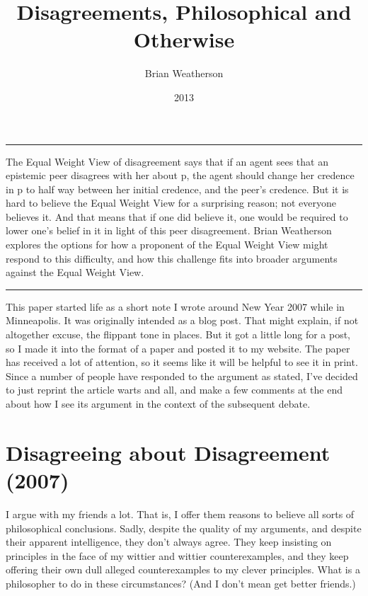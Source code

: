 \documentclass[
  10pt,
  letterpaper,
  DIV=11,
  numbers=noendperiod,
  twoside]{scrartcl}
\title{Disagreements, Philosophical and Otherwise}
\author{Brian Weatherson}
\date{2013}
\renewenvironment{abstract}
 {\vspace{-1.25cm}
 \quotation\small\noindent\rule{\linewidth}{.5pt}\par\smallskip
 \noindent }
 {\par\noindent\rule{\linewidth}{.5pt}\endquotation}
\begin{document}
\maketitle
\begin{abstract}
The Equal Weight View of disagreement says that if an agent sees that an
epistemic peer disagrees with her about p, the agent should change her
credence in p to half way between her initial credence, and the peer's
credence. But it is hard to believe the Equal Weight View for a
surprising reason; not everyone believes it. And that means that if one
did believe it, one would be required to lower one's belief in it in
light of this peer disagreement. Brian Weatherson explores the options
for how a proponent of the Equal Weight View might respond to this
difficulty, and how this challenge fits into broader arguments against
the Equal Weight View.
\end{abstract}


This paper started life as a short note I wrote around New Year 2007
while in Minneapolis. It was originally intended as a blog post. That
might explain, if not altogether excuse, the flippant tone in places.
But it got a little long for a post, so I made it into the format of a
paper and posted it to my website. The paper has received a lot of
attention, so it seems like it will be helpful to see it in print. Since
a number of people have responded to the argument as stated, I've
decided to just reprint the article warts and all, and make a few
comments at the end about how I see its argument in the context of the
subsequent debate.

\section*{Disagreeing about Disagreement
(2007)}\label{disagreeing-about-disagreement-2007}

I argue with my friends a lot. That is, I offer them reasons to believe
all sorts of philosophical conclusions. Sadly, despite the quality of my
arguments, and despite their apparent intelligence, they don't always
agree. They keep insisting on principles in the face of my wittier and
wittier counterexamples, and they keep offering their own dull alleged
counterexamples to my clever principles. What is a philosopher to do in
these circumstances? (And I don't mean get better friends.)
\end{document}
